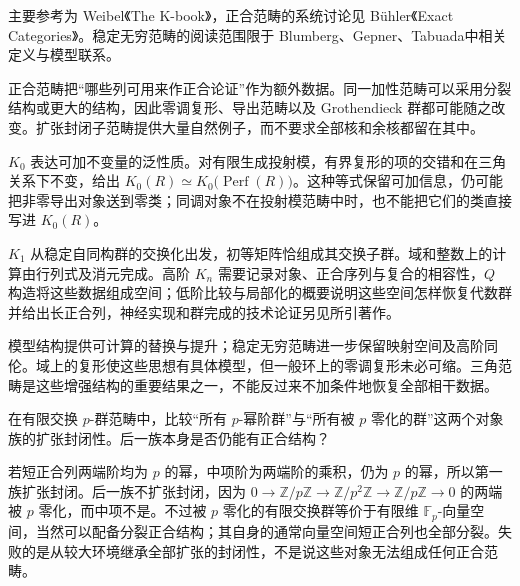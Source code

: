\ProseParagraphBreak
主要参考为 Weibel《The K-book》\cite[Chapter II, Section 7; Chapter III, Section 1; Chapter IV, Sections 6--7; Chapter V, Theorem 5.1 and Definition 10.4]{Weibel2013KBook}，正合范畴的系统讨论见 Bühler《Exact Categories》\cite[Sections 2 and 10]{Buehler2010ExactCategories}。稳定无穷范畴的阅读范围限于 Blumberg、Gepner、Tabuada\cite[Section 2.2, pp. 747--750]{BlumbergGepnerTabuada2013UniversalKTheory}中相关定义与模型联系。






\begin{chaptersummary}
	正合范畴把“哪些列可用来作正合论证”作为额外数据。同一加性范畴可以采用分裂结构或更大的结构，因此零调复形、导出范畴以及 Grothendieck 群都可能随之改变。扩张封闭子范畴提供大量自然例子，而不要求全部核和余核都留在其中。

	\ProseParagraphBreak
	\(K_0\) 表达可加不变量的泛性质。对有限生成投射模，有界复形的项的交错和在三角关系下不变，给出 \(K_0(R)\simeq K_0\bigl(\operatorname{Perf}(R)\bigr)\)。这种等式保留可加信息，仍可能把非零导出对象送到零类；同调对象不在投射模范畴中时，也不能把它们的类直接写进 \(K_0(R)\)。

	\ProseParagraphBreak
	\(K_1\) 从稳定自同构群的交换化出发，初等矩阵恰组成其交换子群。域和整数上的计算由行列式及消元完成。高阶 \(K_n\) 需要记录对象、正合序列与复合的相容性，\(Q\) 构造将这些数据组成空间；低阶比较与局部化的概要说明这些空间怎样恢复代数群并给出长正合列，神经实现和群完成的技术论证另见所引著作。

	\ProseParagraphBreak
	模型结构提供可计算的替换与提升；稳定无穷范畴进一步保留映射空间及高阶同伦。域上的复形使这些思想有具体模型，但一般环上的零调复形未必可缩。三角范畴是这些增强结构的重要结果之一，不能反过来不加条件地恢复全部相干数据。
\end{chaptersummary}

\BookExercises

\begin{exercise}\label{b4:ex:B-exponent-extension}
	在有限交换 \(p\)-群范畴中，比较“所有 \(p\)-幂阶群”与“所有被 \(p\) 零化的群”这两个对象族的扩张封闭性。后一族本身是否仍能有正合结构？
\end{exercise}
\begin{solution}
	若短正合列两端阶均为 \(p\) 的幂，中项阶为两端阶的乘积，仍为 \(p\) 的幂，所以第一族扩张封闭。后一族不扩张封闭，因为 \(0\rightarrow\mathbb Z/p\mathbb Z\rightarrow\mathbb Z/p^2\mathbb Z\rightarrow\mathbb Z/p\mathbb Z\rightarrow0\) 的两端被 \(p\) 零化，而中项不是。不过被 \(p\) 零化的有限交换群等价于有限维 \(\mathbb F_p\)-向量空间，当然可以配备分裂正合结构；其自身的通常向量空间短正合列也全部分裂。失败的是从较大环境继承全部扩张的封闭性，不是说这些对象无法组成任何正合范畴。
\end{solution}

